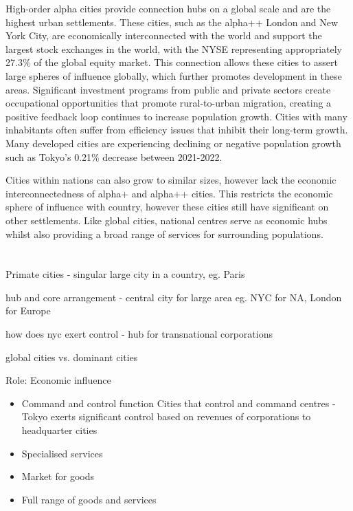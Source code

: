 	High-order alpha cities provide connection hubs on a global scale and are the highest urban settlements. These cities, such as the alpha++ London and New York City, are economically interconnected with the world and support the largest stock exchanges in the world, with the NYSE representing appropriately 27.3\% of the global equity market. This connection allows these cities to assert large spheres of influence globally, which further promotes development in these areas. Significant investment programs from public and private sectors create occupational opportunities that promote rural-to-urban migration, creating a positive feedback loop continues to increase population growth. Cities with many inhabitants often suffer from efficiency issues that inhibit their long-term growth. Many developed cities are experiencing declining or negative population growth such as Tokyo's 0.21\% decrease between 2021-2022.

	Cities within nations can also grow to similar sizes, however lack the economic interconnectedness of alpha+ and alpha++ cities. This restricts the economic sphere of influence with country, however these cities still have significant on other settlements. Like global cities, national centres serve as economic hubs whilst also providing a broad range of services for surrounding populations.

\section{}

	Primate cities - singular large city in a country, eg. Paris

	hub and core arrangement - central city for large area eg. NYC for NA, London for Europe

	how does nyc exert control - hub for transnational corporations

	global cities vs. dominant cities



	Role: Economic influence
	\begin{itemize}
		\item Command and control function
			\subitem Cities that control and command centres - Tokyo exerts significant control based on revenues of corporations to headquarter cities
		\item Specialised services
		\item Market for goods
		\item Full range of goods and services
	\end{itemize}


